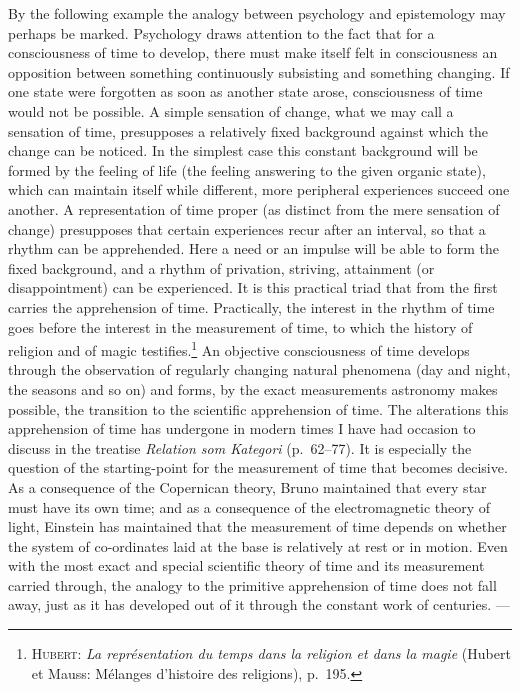 \documentclass[12pt]{book}
\newcommand{\opage}[1]{\marginnote{\footnotesize\textit{[#1]}}}
\begin{document}
By the following example the analogy between psychology and epistemology may
perhaps be marked. Psychology draws attention to the fact that for a
consciousness of time to develop, there must make itself felt in consciousness an
opposition between something continuously subsisting and something changing. If
one state were forgotten as soon as another state arose, consciousness of time
would not be possible. A simple sensation of change, what we may call a sensation
of time, presupposes a relatively fixed background against which the change can
be noticed. In the simplest case this constant background will be formed by the
feeling of life (the feeling answering to the given organic state), which can
maintain itself while different, more peripheral experiences succeed one another.
A representation of time proper (as distinct from the mere sensation of change)
presupposes that certain experiences recur after an interval, so that a rhythm
can be apprehended. Here a need or an impulse will be able to form the fixed
background, and a rhythm of privation, striving, attainment (or disappointment)
can be experienced. It is this practical triad that from the first carries the
apprehension of time. Practically, the interest in the rhythm of time goes before
the interest in the measurement of time, to which the history of religion and of
magic testifies.\footnote{\textsc{Hubert:} \textit{La représentation du temps
dans la religion et dans la magie} (Hubert et Mauss: Mélanges d'histoire des
religions), p.\ 195.} An objective consciousness of time develops through the
observation of regularly changing natural phenomena (day and night, the seasons
and so on) \opage{70}and forms, by the exact measurements astronomy makes possible, the
transition to the scientific apprehension of time. The alterations this
apprehension of time has undergone in modern times I have had occasion to discuss
in the treatise \textit{Relation som Kategori} (p.\ 62--77). It is especially the
question of the starting-point for the measurement of time that becomes decisive.
As a consequence of the Copernican theory, Bruno maintained that every star must
have its own time; and as a consequence of the electromagnetic theory of light,
Einstein has maintained that the measurement of time depends on whether the
system of co-ordinates laid at the base is relatively at rest or in motion. Even
with the most exact and special scientific theory of time and its measurement
carried through, the analogy to the primitive apprehension of time does not fall
away, just as it has developed out of it through the constant work of
centuries. ---
\end{document}
